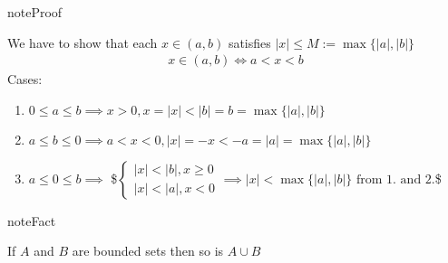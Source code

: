 \documentclass[letterpaper,10pt,english]{jupyterBook}
\begin{document}
\begin{sphinxadmonition}{note}{Proof}

\sphinxAtStartPar
We have to show that each \(x \in (a, b)\) satisfies \(|x| \leq M := \max\{ |a|, |b| \}\)
\begin{equation*}
\begin{split}
x \in (a, b) \iff a < x < b
\end{split}
\end{equation*}
\sphinxAtStartPar
Cases:
\begin{enumerate}
%
\item {} 
\sphinxAtStartPar
\(0 \le a \le b \implies x > 0, x = |x| < |b| = b = \max\{|a|,|b|\}\)

\item {} 
\sphinxAtStartPar
\(a \le b \le 0 \implies a < x < 0, |x|= -x < -a = |a| = \max\{|a|,|b|\}\)

\item {} 
\sphinxAtStartPar
\(a \le 0 \le b \implies\)
\$\(
\begin{cases}
|x|<|b|, x \ge 0\\
|x|<|a|, x < 0
\end{cases}
\implies |x|< \max\{|a|,|b|\} \text{ from 1. and 2.}
\)\$

\end{enumerate}
\end{sphinxadmonition}

\begin{sphinxadmonition}{note}{Fact}

\sphinxAtStartPar
If \(A\) and \(B\) are bounded sets then so is \(A \cup B\)
\end{sphinxadmonition}
\end{document}
